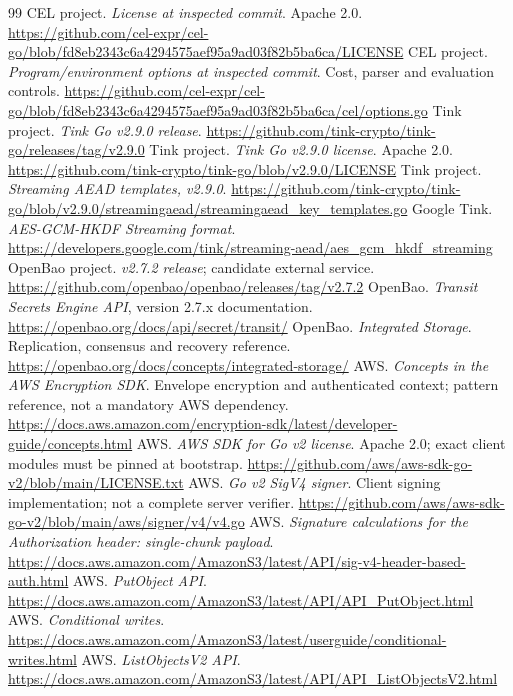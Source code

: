 \begin{thebibliography}{99}
 CEL project. \emph{License at inspected commit}. Apache 2.0. \url{https://github.com/cel-expr/cel-go/blob/fd8eb2343c6a4294575aef95a9ad03f82b5ba6ca/LICENSE}
 CEL project. \emph{Program/environment options at inspected commit}. Cost, parser and evaluation controls. \url{https://github.com/cel-expr/cel-go/blob/fd8eb2343c6a4294575aef95a9ad03f82b5ba6ca/cel/options.go}
 Tink project. \emph{Tink Go v2.9.0 release}. \url{https://github.com/tink-crypto/tink-go/releases/tag/v2.9.0}
 Tink project. \emph{Tink Go v2.9.0 license}. Apache 2.0. \url{https://github.com/tink-crypto/tink-go/blob/v2.9.0/LICENSE}
 Tink project. \emph{Streaming AEAD templates, v2.9.0}. \url{https://github.com/tink-crypto/tink-go/blob/v2.9.0/streamingaead/streamingaead_key_templates.go}
 Google Tink. \emph{AES-GCM-HKDF Streaming format}. \url{https://developers.google.com/tink/streaming-aead/aes_gcm_hkdf_streaming}
 OpenBao project. \emph{v2.7.2 release}; candidate external service. \url{https://github.com/openbao/openbao/releases/tag/v2.7.2}
 OpenBao. \emph{Transit Secrets Engine API}, version 2.7.x documentation. \url{https://openbao.org/docs/api/secret/transit/}
 OpenBao. \emph{Integrated Storage}. Replication, consensus and recovery reference. \url{https://openbao.org/docs/concepts/integrated-storage/}
 AWS. \emph{Concepts in the AWS Encryption SDK}. Envelope encryption and authenticated context; pattern reference, not a mandatory AWS dependency. \url{https://docs.aws.amazon.com/encryption-sdk/latest/developer-guide/concepts.html}
 AWS. \emph{AWS SDK for Go v2 license}. Apache 2.0; exact client modules must be pinned at bootstrap. \url{https://github.com/aws/aws-sdk-go-v2/blob/main/LICENSE.txt}
 AWS. \emph{Go v2 SigV4 signer}. Client signing implementation; not a complete server verifier. \url{https://github.com/aws/aws-sdk-go-v2/blob/main/aws/signer/v4/v4.go}
 AWS. \emph{Signature calculations for the Authorization header: single-chunk payload}. \url{https://docs.aws.amazon.com/AmazonS3/latest/API/sig-v4-header-based-auth.html}
 AWS. \emph{PutObject API}. \url{https://docs.aws.amazon.com/AmazonS3/latest/API/API_PutObject.html}
 AWS. \emph{Conditional writes}. \url{https://docs.aws.amazon.com/AmazonS3/latest/userguide/conditional-writes.html}
 AWS. \emph{ListObjectsV2 API}. \url{https://docs.aws.amazon.com/AmazonS3/latest/API/API_ListObjectsV2.html}

\end{thebibliography}
